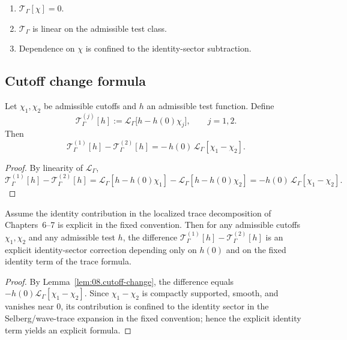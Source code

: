 \begin{remark}\label{rem:08.immediate}
\leavevmode
\begin{enumerate}
\item\label{it:08.immediate1} $\mathcal T_\Gamma[\chi]=0$.
\item\label{it:08.immediate2} $\mathcal T_\Gamma$ is linear on the admissible test class.
\item\label{it:08.immediate3} Dependence on $\chi$ is confined to the identity-sector subtraction.
\end{enumerate}
\end{remark}

\subsection{Cutoff change formula}\label{subsec:08.cutoff-change}

\begin{lemma}\label{lem:08.cutoff-change}
Let $\chi_1,\chi_2$ be admissible cutoffs and $h$ an admissible test function. Define
\[
\mathcal T^{(j)}_\Gamma[h]:=\mathcal L_\Gamma\big[h-h(0)\chi_j\big],\qquad j=1,2.
\]
Then
\begin{equation}\label{eq:08.cutoff-change}
\mathcal T^{(1)}_\Gamma[h]-\mathcal T^{(2)}_\Gamma[h]
=-\,h(0)\,\mathcal L_\Gamma[\chi_1-\chi_2].
\end{equation}
\end{lemma}

\begin{proof}
By linearity of $\mathcal L_\Gamma$,
\[
\mathcal T^{(1)}_\Gamma[h]-\mathcal T^{(2)}_\Gamma[h]
=\mathcal L_\Gamma[h-h(0)\chi_1]-\mathcal L_\Gamma[h-h(0)\chi_2]
=-h(0)\,\mathcal L_\Gamma[\chi_1-\chi_2].
\]
\end{proof}

\begin{theorem}\label{thm:08.canonical-mod-identity}
Assume the identity contribution in the localized trace decomposition of Chapters~6--7 is explicit in the fixed convention.
Then for any admissible cutoffs $\chi_1,\chi_2$ and any admissible test $h$,
the difference $\mathcal T^{(1)}_\Gamma[h]-\mathcal T^{(2)}_\Gamma[h]$ is an explicit identity-sector correction depending only on
$h(0)$ and on the fixed identity term of the trace formula.
\end{theorem}

\begin{proof}
By Lemma~\ref{lem:08.cutoff-change}, the difference equals $-h(0)\mathcal L_\Gamma[\chi_1-\chi_2]$.
Since $\chi_1-\chi_2$ is compactly supported, smooth, and vanishes near $0$, its contribution is confined to the identity sector
in the Selberg/wave-trace expansion in the fixed convention; hence the explicit identity term yields an explicit formula.
\end{proof}

